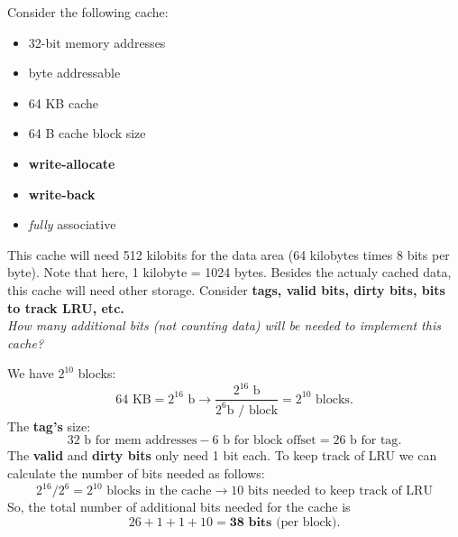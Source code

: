 \newpage

\begin{problem}
  Consider the following cache:
  \begin{multicols}{2}
    \begin{itemize}
      \item 32-bit memory addresses
      \item byte addressable
      \item 64 KB cache
      \item 64 B cache block size
      \item \textbf{write-allocate} 
      \item \textbf{write-back}
      \item \emph{fully} associative 
    \end{itemize}
  \end{multicols}
  This cache will need 512 kilobits for the data area (64 kilobytes times 8 bits per byte). Note that here, 1 kilobyte = 1024 bytes. Besides the actualy cached data, this cache will need other storage. Consider \textbf{tags, valid bits, dirty bits, bits to track LRU, etc.} \\
  \emph{How many additional bits (not counting data) will be needed to implement this cache?} 
\end{problem}
\begin{answer}
  We have \(2^{10}\) blocks:
  \[
    64 \text{ KB} = 2^{16} \text{ b} \rightarrow \frac{2^{16} \text{ b} }{2^6 \text{b / block} } = 2^{10} \text{ blocks} .
  \]
  The \textbf{tag's} size:
  \[
    32 \text{ b for mem addresses} - 6 \text{ b for block offset} = 26 \text{ b for tag}. 
  \]
  The \textbf{valid} and \textbf{dirty bits} only need 1 bit each. To keep track of LRU we can calculate the number of bits needed as follows:
  \[
    2^{16} / 2^6 = 2^{10} \text{ blocks in the cache} \rightarrow \text{10 bits needed to keep track of LRU}
  \]
  So, the total number of additional bits needed for the cache is
  \[
    26 + 1 + 1 + 10 = \textbf{38 bits} \text{ (per block)} . 
  \] 

\end{answer}

